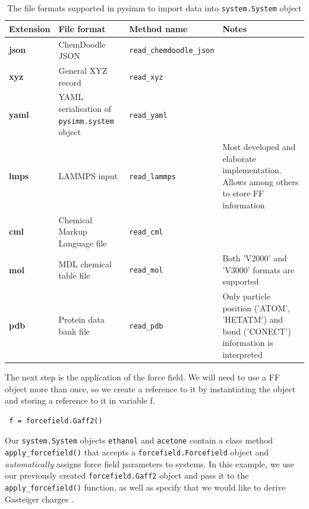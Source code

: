 \documentclass[9pt,tutorial]{livecoms}
\begin{document}
\begin{table}[bt!]
\caption{\label{tab:file_formats}The file formats supported in pysimm to import data into \lstinline$system.System$ object}

\begin{tabular}{p{}p{}p{}p{}}
\toprule
Extension        & File format                      & Method name                                    & Notes        \\
\midrule
\textbf{json}    & ChemDoodle JSON                  & \lstinline$read_chemdoodle_json$          &               \\
\textbf{xyz}     & General XYZ record               & \lstinline$read_xyz$                      &               \\
\textbf{yaml}    & YAML serialisation of \lstinline$pysimm.system$ object    & \lstinline$read_yaml$                      &               \\
\textbf{lmps}    & LAMMPS input                 & \lstinline$read_lammps$            & Most developed and elaborate implementation. Allows among others to store FF information     \\
\textbf{cml}     & Chemical Markup Language file    & \lstinline$read_cml$           &      \\
\textbf{mol}     & MDL chemical table file          & \lstinline$read_mol$           &  Both 'V2000' and 'V3000' formats are supported \\
\textbf{pdb}     & Protein data bank file           & \lstinline$read_pdb$           &  Only particle position ('ATOM', 'HETATM') and bond ('CONECT') information is interpreted\\

\bottomrule
\end{tabular}
\medskip
\end{table}

The next step is the application of the force field. We will need to use a FF object more than once, so we create a reference to it by instantiating the object and storing a reference to it in variable f.

\begin{lstlisting}
 f = forcefield.Gaff2()
\end{lstlisting}

Our \lstinline$system.System$ objects \lstinline$ethanol$ and \lstinline$acetone$ contain a class method \lstinline$apply_forcefield()$ that accepts a \lstinline$forcefield.Forcefield$ object and \textit{automatically} assigns force field parameters to systems. In this example, we use our previously created \lstinline$forcefield.Gaff2$ object and pass it to the \lstinline$apply_forcefield()$ function, as well as specify that we would like to derive Gasteiger charges \cite{gasteiger}.
\end{document}
